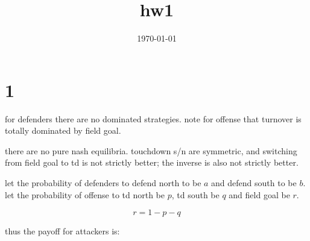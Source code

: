 \documentclass{article}
\title{hw1}
\date{\today}
\begin{document}
\maketitle

\section{1}

for defenders there are no dominated strategies.
note for offense that turnover is totally dominated by field goal. 

there are no pure nash equilibria. touchdown s/n are symmetric, and switching from field goal to td is not strictly better; the inverse is also not strictly better. 

let the probability of defenders to defend north to be \(a\) and defend south to be \(b\). let the probability of offense to td north be \(p\), td south be \(q\) and field goal be \(r\). 

\[r = 1-p-q\]

thus the payoff for attackers is:

\begin{equation}
    
\end{equation}
\end{document}

